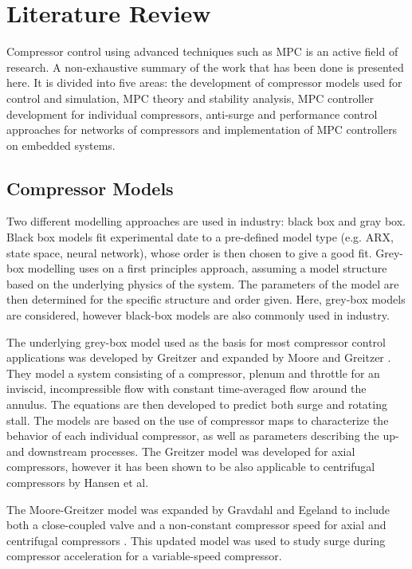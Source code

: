 \chapter{Literature Review}
\label{sec:lit}

Compressor control using advanced techniques such as MPC is an active field of research. 
A non-exhaustive summary of the work that has been done is presented here.
It is divided into five areas: the development of compressor models used for control and simulation, MPC theory and stability analysis, MPC controller development for individual compressors, anti-surge and performance control approaches for networks of compressors and implementation of MPC controllers on embedded systems. 

\section{Compressor Models}

Two different modelling approaches are used in industry: black box and gray box. Black box models fit experimental date to a pre-defined model type (e.g. ARX, state space, neural network), whose order is then chosen to give a good fit. 
Grey-box modelling uses on a first principles approach, assuming a model structure based on the underlying physics of the system. 
The parameters of the model are then determined for the specific structure and order given. 
Here, grey-box models are considered, however black-box models are also commonly used in industry.

The underlying grey-box model used as the basis for most compressor control applications was developed by Greitzer \cite{Greitzer1976} and expanded by Moore and Greitzer \cite{Moore1985}.
They model a system consisting of a compressor, plenum and throttle for an inviscid, incompressible flow with constant time-averaged flow around the annulus. 
The equations are then developed to predict both surge and rotating stall.
The models are based on the use of compressor maps to characterize the behavior of each individual compressor, as well as parameters describing the up- and downstream processes.
The Greitzer model was developed for axial compressors, however it has been shown to be also applicable to centrifugal compressors by Hansen et al. \cite{Hansen1981} 

The Moore-Greitzer model was expanded by Gravdahl and Egeland to include both a close-coupled valve and a non-constant compressor speed for axial and centrifugal compressors \cite{Gravdahl1999}. 
This updated model was used to study surge during compressor acceleration for a variable-speed compressor.

